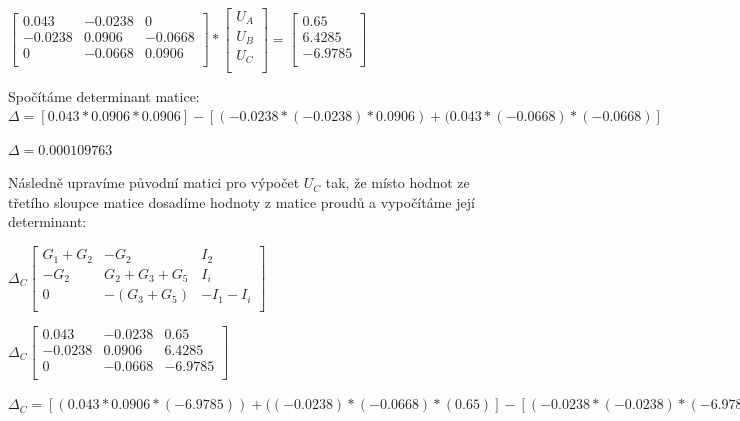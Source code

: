 \documentclass[12pt]{article}
\begin{document}
\begin{center}
$\begin{bmatrix}
0.043 & -0.0238 & 0\\
-0.0238 & 0.0906 & -0.0668\\
0 & -0.0668 & 0.0906\\
\end{bmatrix}
*
\begin{bmatrix}
U_A\\
U_B\\
U_C\\
\end{bmatrix}
=
\begin{bmatrix}
0.65\\
6.4285\\
-6.9785\\
\end{bmatrix}$
\clearpage

Spočítáme determinant matice:\\
\vspace{10px}$\Delta =[0.043*0.0906*0.0906]-[(-0.0238*(-0.0238)*0.0906)+(0.043*(-0.0668)*(-0.0668)]$\\
\vspace{10px}

$\Delta =0.000109763$\\
\vspace{15px}

Následně upravíme původní matici pro výpočet $U_C$ tak, že místo hodnot ze třetího sloupce matice dosadíme hodnoty z matice proudů a vypočítáme její determinant:
\vspace{15px}

$\Delta_C\begin{bmatrix}
G_1+G_2 & -G_2 & I_2\\
-G_2 & G_2+G_3+G_5 & I_i\\
0 & -(G_3+G_5) & -I_1-I_i\\
\end{bmatrix}$\\
\vspace{10px}

$\Delta_C\begin{bmatrix}
0.043 & -0.0238 & 0.65\\
-0.0238 & 0.0906 & 6.4285\\
0 & -0.0668 & -6.9785\\
\end{bmatrix}$
\vspace{10px}

$\Delta_C =[(0.043*0.0906*(-6.9785))+((-0.0238)*(-0.0668)*(0.65)]-[(-0.0238*(-0.0238)*(-6.9785))+(6.4285*(-0.668)*0.043)]$\\
\vspace{10px}


\end{center}
\end{document}
